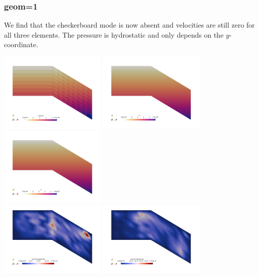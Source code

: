 \subsubsection{geom=1}

We find that the checkerboard mode is now absent and velocities are still zero
for all three elements. The pressure is hydrostatic and only depends on the $y$-coordinate.

\begin{center}
\includegraphics[width=5.1cm]{python_codes/fieldstone_42/results/geom1/press1}
\includegraphics[width=5.1cm]{python_codes/fieldstone_42/results/geom1/press2}
\includegraphics[width=5.1cm]{python_codes/fieldstone_42/results/geom1/press3}\\
\includegraphics[width=5.1cm]{python_codes/fieldstone_42/results/geom1/vel1}
\includegraphics[width=5.1cm]{python_codes/fieldstone_42/results/geom1/vel2}

\end{center}
